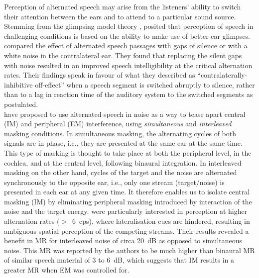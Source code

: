\documentclass[a4paper, twoside]{templates/ociamthesis}
\begin{document}
Perception of alternated speech may arise from the listeners' ability to switch their attention between the ears and to attend to a particular sound source. Stemming from the glimpsing model theory \autocite{Cooke2006}, \textcite{Brungart2012} posited that perception of speech in challenging conditions is based on the ability to make use of better-ear glimpses. \textcite{Schubert1955} compared the effect of alternated speech passages with gaps of silence or with a white noise in the contralateral ear. They found that replacing the silent gaps with noise resulted in an improved speech intelligibility at the critical alternation rates. Their findings speak in favour of what they described as ``contralaterally-inhibitive off-effect'' when a speech segment is switched abruptly to silence, rather than to a lag in reaction time of the auditory system to the switched segments as \textcite{Cherry1954} postulated.\\

\textcite{Hoffman1978} have proposed to use alternated speech in noise as a way to tease apart central (IM) and peripheral (EM) interference, using \textit{simultaneous} and \textit{interleaved} masking conditions. In simultaneous masking, the alternating cycles of both signals are in phase, i.e., they are presented at the same ear at the same time. This type of masking is thought to take place at both the peripheral level, in the cochlea, and at the central level, following binaural integration. In interleaved masking on the other hand, cycles of the target and the noise are alternated synchronously to the opposite ear, i.e., only one stream (target/noise) is presented in each ear at any given time. It therefore enables us to isolate central masking (IM) by eliminating peripheral masking introduced by interaction of the noise and the target energy. \textcite{Hoffman1978} were particularly interested in perception at higher alternation rates (\(>\)~6~cps), where lateralisation cues are hindered, resulting in ambiguous spatial perception of the competing streams. Their results revealed a benefit in MR for interleaved noise of circa 20~dB as opposed to simultaneous noise. This MR was reported by the authors to be much higher than binaural MR of similar speech material of 3 to 6~dB, which suggests that IM results in a greater MR when EM was controlled for.\\
\end{document}
